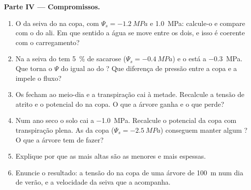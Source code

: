 \begin{problem}
\medskip
\noindent\textbf{Parte IV --- Compromissos.}
\begin{enumerate}[resume]
  \item O  da seiva do  na copa, com
        $\Psi_s = \qty{-1.2}{MPa}$ e  \qty{1.0}{MPa}:
        calcule-o e compare com o do  ali. Em que sentido a água
        se move entre os dois, e isso é coerente com o carregamento?
  \item Na  a seiva do  tem \qty{5}{\%} de sacarose ($\Psi_s =
        \qty{-0.4}{MPa}$) e o  está a \qty{-0.3}{MPa}. Que
         torna o $\Psi$ do  igual ao do ? Que
        diferença de pressão entre a copa e a  impele o fluxo?
  \item Os  fecham ao meio-dia e a transpiração cai à metade.
        Recalcule a tensão de atrito e o potencial do  na copa. O
        que a árvore ganha e o que perde?
  \item Num ano seco o solo cai a \qty{-1.0}{MPa}. Recalcule o
        potencial da copa com transpiração plena. As  da copa
        ($\Psi_s = \qty{-2.5}{MPa}$) conseguem manter algum
        ? O que a árvore tem de fazer?
  \item Explique por que as  mais altas são as menores e mais
        espessas.
  \item Enuncie o resultado: a tensão do  na copa de uma árvore
        de \qty{100}{m} num dia de verão, e a velocidade da seiva que a
        acompanha.
\end{enumerate}
\end{problem}
